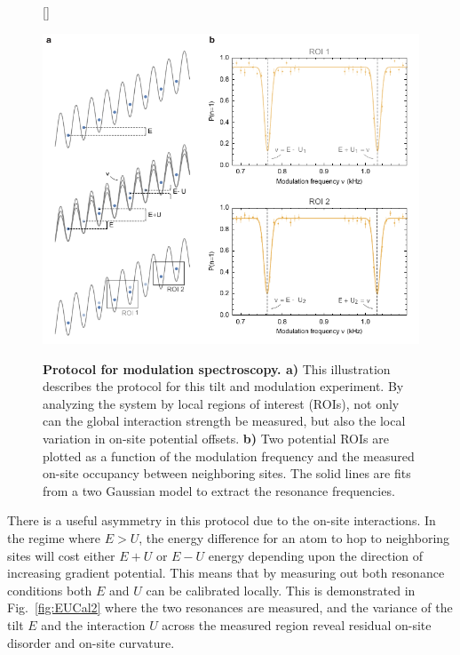 \begin{figure}
[\FBwidth]
{\caption{\textbf{Protocol for modulation spectroscopy. a)} This illustration describes the protocol for this tilt and modulation experiment. By analyzing the system by local regions of interest (ROIs), not only can the global interaction strength be measured, but also the local variation in on-site potential offsets. \textbf{b)} Two potential ROIs are plotted as a function of the modulation frequency and the measured on-site occupancy between neighboring sites. The solid lines are fits from a two Gaussian model to extract the resonance frequencies.}
		\label{fig:EUCal1}}
{\includegraphics[width=4 in]{figures/ch2/E_U_cal/UCalv2edit.pdf} }
\end{figure}

There is a useful asymmetry in this protocol due to the on-site interactions. In the regime where $E>U$, the energy difference for an atom to hop to neighboring sites will cost either $E+U$ or $E-U$ energy depending upon the direction of increasing gradient potential. This means that by measuring out both resonance conditions both $E$ and $U$ can be calibrated locally. This is demonstrated in Fig.~\ref{fig:EUCal2} where the two resonances are measured, and the variance of the tilt $E$ and the interaction $U$ across the measured region reveal residual on-site disorder and on-site curvature. 

